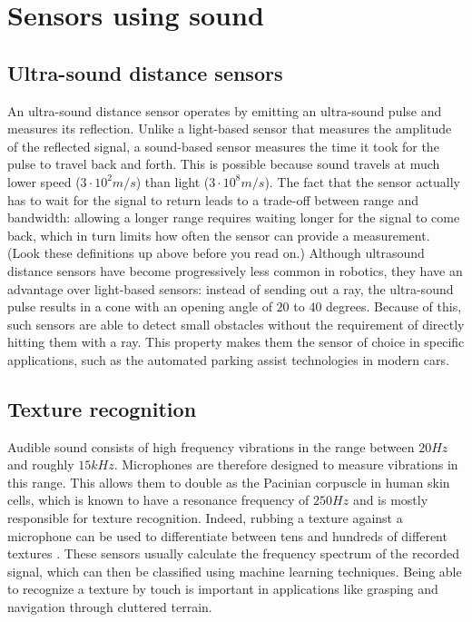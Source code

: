\section{Sensors using sound}\label{sec:sensors:sound}

\subsection{Ultra-sound distance sensors}

An ultra-sound distance sensor operates by emitting an ultra-sound pulse and measures its reflection. Unlike a light-based sensor that measures the amplitude of the reflected signal, a sound-based sensor measures the time it took for the pulse to travel back and forth.
This is possible because sound travels at much lower speed ($3\cdot10^2m/s$) than light ($3\cdot10^8m/s$). The fact that the sensor actually has to wait for the signal to return leads to a trade-off between range and bandwidth: allowing a longer range requires waiting longer for the signal to come back, which in turn limits how often the sensor can provide a measurement.
(Look these definitions up above before you read on.)
Although ultrasound distance sensors have become progressively less common in robotics, they have an advantage over light-based sensors: instead of sending out a ray, the ultra-sound pulse results in a cone with an opening angle of $20$ to $40$ degrees. Because of this, such sensors are able to detect small obstacles without the requirement of directly hitting them with a ray. This property makes them the sensor of choice in specific applications, such as the automated parking assist technologies in modern cars.

\subsection{Texture recognition}

Audible sound consists of high frequency vibrations in the range between $20Hz$ and roughly $15kHz$. Microphones are therefore designed to measure vibrations in this range. This allows them to double as the Pacinian corpuscle in human skin cells, which is known to have a resonance frequency of $250Hz$ and is mostly responsible for texture recognition. Indeed, rubbing a texture against a microphone can be used to differentiate between tens and hundreds of different textures \cite{hughes14}. These sensors usually calculate the frequency spectrum of the recorded signal, which can then be classified using machine learning techniques. Being able to recognize a texture by touch is important in applications like grasping and navigation through cluttered terrain.


